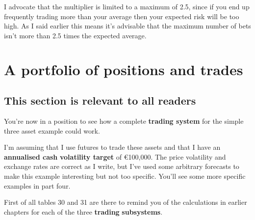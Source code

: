 I advocate that the multiplier is limited to a maximum of 2.5, since if you end up frequently trading more than your average then your expected risk will be too high. As I said earlier this means it's advisable that the maximum number of bets isn't more than 2.5 times the expected average.

\section*{A portfolio of positions and trades}  {}

\subsection*{This section is relevant to all readers}

You're now in a position to see how a complete \textbf{trading system} for the simple three asset example could work.

I'm assuming that I use futures to trade these assets and that I have an \textbf{annualised cash} \textbf{volatility target} of €100,000. The price volatility and exchange rates are correct as I write, but I've used some arbitrary forecasts to make this example interesting but not too specific. You'll see some more specific examples in part four.

First of all tables 30 and 31 are there to remind you of the calculations in earlier chapters for each of the three \textbf{trading} \textbf{subsystems}.

 \begingroup \small \centering
{}
\par \endgroup

